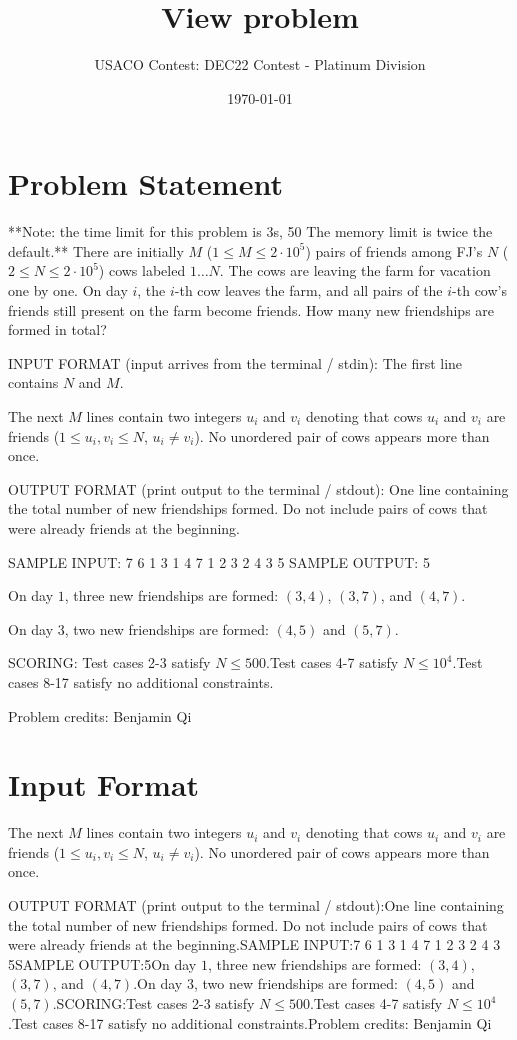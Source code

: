 \documentclass[12pt]{article}
\title{View problem}
\author{USACO Contest: DEC22 Contest - Platinum Division}
\date{\today}
\begin{document}
\maketitle

\section*{Problem Statement}

**Note: the time limit for this problem is 3s, 50%
The memory limit is twice the default.**
There are initially $M$ ($1\le M\le 2\cdot 10^5$) pairs of friends among FJ's
$N$ ($2\le N\le 2\cdot 10^5$) cows labeled $1\dots N$. The cows are leaving the
farm for vacation one by one. On day $i$, the $i$-th cow leaves the farm, and
all pairs of the $i$-th cow's friends still present on the farm become friends.
How many new friendships are formed in total?

INPUT FORMAT (input arrives from the terminal / stdin):
The first line contains $N$ and $M$.

The next $M$ lines contain two integers $u_i$ and $v_i$ denoting that cows $u_i$
and $v_i$ are friends ($1\le u_i,v_i\le N$, $u_i\neq v_i$). No unordered  pair
of cows appears more than once.

OUTPUT FORMAT (print output to the terminal / stdout):
One line containing the total number of new friendships formed. Do not include pairs of cows that
were already friends at the beginning.

SAMPLE INPUT:
7 6
1 3
1 4
7 1
2 3
2 4
3 5
SAMPLE OUTPUT: 
5

On day $1$, three new friendships are formed: $(3,4)$, $(3,7)$, and $(4,7)$.

On day $3$, two new friendships are formed: $(4,5)$ and $(5,7)$.

SCORING:
Test cases 2-3 satisfy $N\le 500$.Test cases 4-7 satisfy $N\le 10^4$.Test cases 8-17 satisfy no additional constraints.


Problem credits: Benjamin Qi



\section*{Input Format}
The next $M$ lines contain two integers $u_i$ and $v_i$ denoting that cows $u_i$
and $v_i$ are friends ($1\le u_i,v_i\le N$, $u_i\neq v_i$). No unordered  pair
of cows appears more than once.

OUTPUT FORMAT (print output to the terminal / stdout):One line containing the total number of new friendships formed. Do not include pairs of cows that
were already friends at the beginning.SAMPLE INPUT:7 6
1 3
1 4
7 1
2 3
2 4
3 5SAMPLE OUTPUT:5On day $1$, three new friendships are formed: $(3,4)$, $(3,7)$, and $(4,7)$.On day $3$, two new friendships are formed: $(4,5)$ and $(5,7)$.SCORING:Test cases 2-3 satisfy $N\le 500$.Test cases 4-7 satisfy $N\le 10^4$.Test cases 8-17 satisfy no additional constraints.Problem credits: Benjamin Qi
\end{document}
